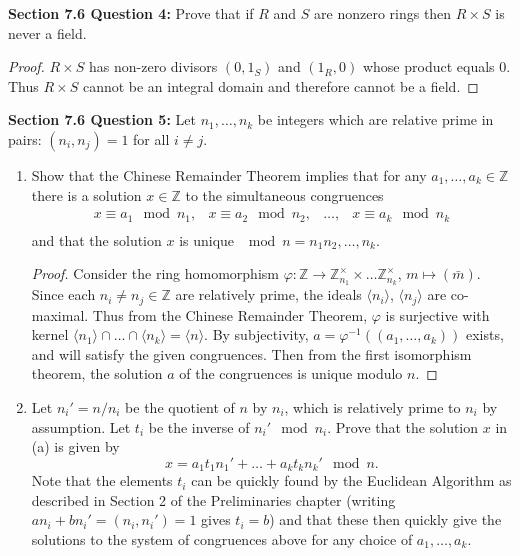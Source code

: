 \documentclass{article}
\begin{document}
\textbf{Section 7.6 Question 4:} Prove that if $R$ and $S$ are nonzero
  rings then $R\times S$ is never a field.
  \begin{proof}
    $R\times S$ has non-zero divisors $(0,1_S)$ and $(1_R,0)$ whose
    product equals 0. Thus $R\times S$ cannot be an integral domain and
    therefore cannot be a field.
  \end{proof}

\textbf{Section 7.6 Question 5:} Let $n_1,\ldots,n_k$ be integers which are
  relative prime in pairs: $(n_i,n_j)=1$ for all $i\neq j$.
  \begin{enumerate}[label={\bf(\alph*)}]
    \item Show that the Chinese Remainder Theorem implies that for any
      $a_1,\ldots,a_k\in\mathbb{Z}$ there is a solution $x\in\mathbb{Z}$ to
      the simultaneous congruences
      \[\begin{array}{cccc}
        x\equiv a_1\mod{n_1}, &
        x\equiv a_2\mod{n_2}, &
        \ldots, &
        x\equiv a_k\mod{n_k} \\
      \end{array}\]
      and that the solution $x$ is unique $\mod{n}=n_1n_2,\ldots,n_k$.

      \begin{proof}
        Consider the ring homomorphism $\varphi:\mathbb{Z}\rightarrow
        \mathbb{Z}_{n_1}^\times \times\ldots \mathbb{Z}_{n_k}^\times$,
        $m\mapsto (\bar{m})$. Since each $n_i\neq n_j\in\mathbb{Z}$ are
        relatively prime, the ideals $\langle n_i\rangle$, $\langle
        n_j\rangle$ are co-maximal. Thus from the Chinese Remainder
        Theorem, $\varphi$ is surjective with kernel $\langle n_1\rangle
        \cap\ldots \cap\langle n_k\rangle =\langle n\rangle$. By
        subjectivity, $a=\varphi^{-1}((a_1,\ldots,a_k))$ exists, and will
        satisfy the given congruences. Then from the first isomorphism
        theorem, the solution $a$ of the congruences is unique modulo
        $n$.
      \end{proof}

    \item Let $n_i'=n/n_i$ be the quotient of $n$ by $n_i$, which is
      relatively prime to $n_i$ by assumption. Let $t_i$ be the inverse of
      $n_i'\mod{n_i}$. Prove that the solution $x$ in (a) is given by
      \[x=a_1t_1n_1'+\ldots+a_kt_kn_k'\mod{n}.\]
      Note that the elements $t_i$ can be quickly found by the Euclidean
      Algorithm as described in Section 2 of the Preliminaries chapter
      (writing $an_i+bn_i'=(n_i,n_i')=1$ gives $t_i=b$) and that these then
      quickly give the solutions to the system of congruences above for any
      choice of $a_1,\ldots,a_k$.


\end{enumerate}
\end{document}
